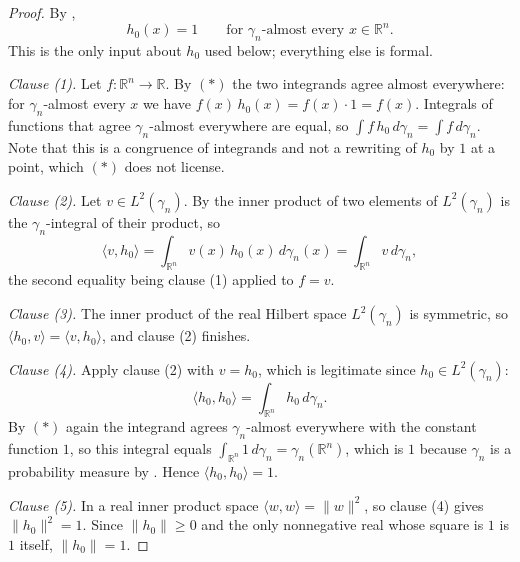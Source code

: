 \begin{proof}
By ,
\begin{equation*}
  h_0(x) = 1 \qquad \text{for } \gamma_n\text{-almost every } x \in \mathbb{R}^n .
  \tag{$\ast$}
\end{equation*}
This is the only input about $h_0$ used below; everything else is formal.

\emph{Clause (1).}  Let $f : \mathbb{R}^n \to \mathbb{R}$.  By $(\ast)$ the two
integrands agree almost everywhere: for $\gamma_n$-almost every $x$ we have
$f(x)\,h_0(x) = f(x)\cdot 1 = f(x)$.  Integrals of functions that agree
$\gamma_n$-almost everywhere are equal, so
$\int f\,h_0 \, d\gamma_n = \int f \, d\gamma_n$.  Note that this is a congruence
of integrands and not a rewriting of $h_0$ by $1$ at a point, which $(\ast)$ does
not license.

\emph{Clause (2).}  Let $v \in L^2(\gamma_n)$.  By 
the inner product of two elements of $L^2(\gamma_n)$ is the $\gamma_n$-integral of
their product, so
\[
  \langle v, h_0\rangle
    = \int_{\mathbb{R}^n} v(x)\, h_0(x) \, d\gamma_n(x)
    = \int_{\mathbb{R}^n} v \, d\gamma_n ,
\]
the second equality being clause (1) applied to $f = v$.

\emph{Clause (3).}  The inner product of the real Hilbert space $L^2(\gamma_n)$ is
symmetric, so $\langle h_0, v\rangle = \langle v, h_0\rangle$, and clause (2)
finishes.

\emph{Clause (4).}  Apply clause (2) with $v = h_0$, which is legitimate since
$h_0 \in L^2(\gamma_n)$:
\[
  \langle h_0, h_0\rangle = \int_{\mathbb{R}^n} h_0 \, d\gamma_n .
\]
By $(\ast)$ again the integrand agrees $\gamma_n$-almost everywhere with the
constant function $1$, so this integral equals
$\int_{\mathbb{R}^n} 1 \, d\gamma_n = \gamma_n(\mathbb{R}^n)$, which is $1$
because $\gamma_n$ is a probability measure by .  Hence
$\langle h_0, h_0\rangle = 1$.

\emph{Clause (5).}  In a real inner product space $\langle w, w\rangle = \|w\|^2$,
so clause (4) gives $\|h_0\|^2 = 1$.  Since $\|h_0\| \geq 0$ and the only
nonnegative real whose square is $1$ is $1$ itself, $\|h_0\| = 1$.
\end{proof}
